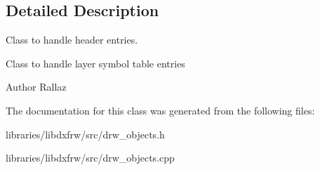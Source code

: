 \subsection{Detailed Description}
Class to handle header entries. 

Class to handle layer symbol table entries \begin{DoxyAuthor}{Author}
Rallaz 
\end{DoxyAuthor}


The documentation for this class was generated from the following files\-:\begin{DoxyCompactItemize}
\item 
libraries/libdxfrw/src/drw\-\_\-objects.\-h\item 
libraries/libdxfrw/src/drw\-\_\-objects.\-cpp\end{DoxyCompactItemize}
